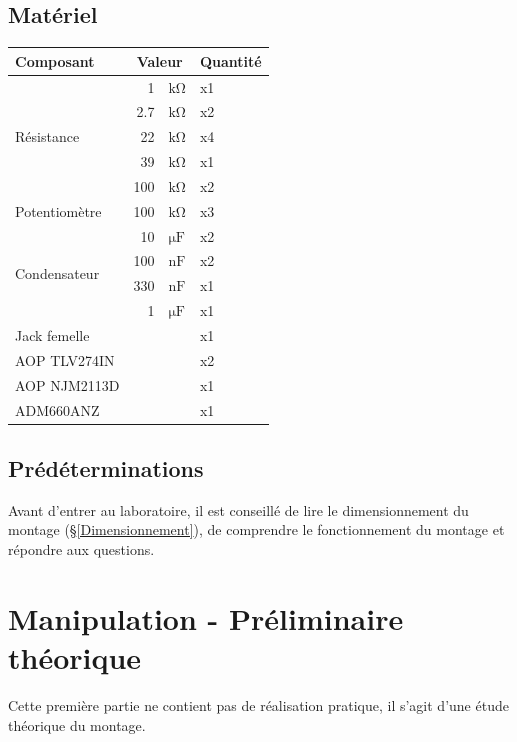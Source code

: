 \subsection{Matériel}
\begin{center}
	\begin{tabular}{p{}rlp{}}
		Composant & \multicolumn{2}{c}{Valeur} & Quantité \\\toprule
		\multirow{5}{*}{Résistance} & 1 & $\si{\kohm}$ & x1 \\
									& 2.7 & $\si{\kohm}$ & x2 \\
									& 22 & $\si{\kohm}$ & x4 \\
									& 39 & $\si{\kohm}$ & x1 \\
									& 100 & $\si{\kohm}$ & x2 \\\midrule
		\multirow{1}{*}{Potentiomètre} 	& 100 & $\si{\kohm}$ & x3 \\\midrule
		\multirow{4}{*}{Condensateur} 	& 10 & $\si{\micro\farad}$ & x2 \\
									 	& 100 & $\si{\nano\farad}$ & x2 \\
									 	& 330 & $\si{\nano\farad}$ & x1 \\
									 	& 1 & $\si{\micro\farad}$ & x1 \\\midrule
		\multirow{1}{*}{Jack femelle} 	&  &  & x1 \\\midrule
		\multirow{1}{*}{AOP TLV274IN} 	&  &  & x2 \\\midrule
		\multirow{1}{*}{AOP NJM2113D} 	&  &  & x1 \\\midrule
		\multirow{1}{*}{ADM660ANZ} 	&  &  & x1 \\\bottomrule
	\end{tabular}
\end{center}

\subsection{Prédéterminations} %
Avant d'entrer au laboratoire, il est conseillé de lire le dimensionnement du montage (§\ref{Dimensionnement}), de comprendre le
fonctionnement du montage et répondre aux questions.



\clearpage
\section{Manipulation - Préliminaire théorique}
Cette première partie ne contient pas de réalisation pratique, il s'agit d'une étude théorique du montage.

